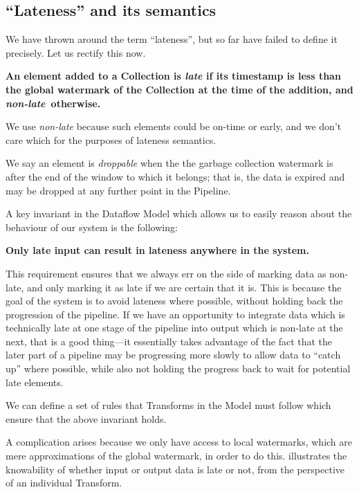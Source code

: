 \subsection{``Lateness'' and its semantics}\label{sec:impl:dataflow:lateness}

We have thrown around the term ``lateness'', but so far have failed to define it precisely.
Let us rectify this now.


\textbf{An element added to a Collection is \emph{late} if its timestamp is less than the global watermark of the Collection at the time of the addition, and \emph{non-late}\footnotemark\ otherwise.}

\footnotetext
{
We use \emph{non-late} because such elements could be on-time or early, and we don't care which for the purposes of lateness semantics.
}

We say an element is \emph{droppable} when the the garbage collection watermark is after the end of the window to which it belongs; that is, the data is expired and may be dropped at any further point in the Pipeline.

A key invariant in the Dataflow Model which allows us to easily reason about the behaviour of our system is the following:

\textbf{Only late input can result in lateness anywhere in the system.}

This requirement ensures that we always err on the side of marking data as non-late, and only marking it as late if we are certain that it is.
This is because the goal of the system is to avoid lateness where possible, without holding back the progression of the pipeline.
If we have an opportunity to integrate data which is technically late at one stage of the pipeline into output which is non-late at the next, that is a good thing---it essentially takes advantage of the fact that the later part of a pipeline may be progressing more slowly to allow data to ``catch up'' where possible, while also not holding the progress back to wait for potential late elements.

We can define a set of rules that Transforms in the Model must follow which ensure that the above invariant holds.

A complication arises because we only have access to local watermarks, which are mere approximations of the global watermark, in order to do this.
 illustrates the knowability of whether input or output data is late or not, from the perspective of an individual Transform.

